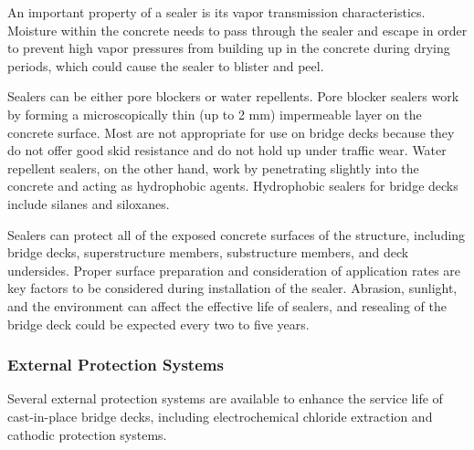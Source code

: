 An important property of a sealer is its vapor transmission characteristics. Moisture within the concrete needs to
pass through the sealer and escape in order to prevent high vapor pressures from building up in the concrete during
drying periods, which could cause the sealer to blister and peel.

Sealers can be either pore blockers or water repellents. Pore blocker sealers work by forming a microscopically
thin (up to 2 mm) impermeable layer on the concrete surface. Most are not appropriate for use on bridge decks
because they do not offer good skid resistance and do not hold up under traffic wear. Water repellent sealers, on the
other hand, work by penetrating slightly into the concrete and acting as hydrophobic agents. Hydrophobic sealers for
bridge decks include silanes and siloxanes.

Sealers can protect all of the exposed concrete surfaces of the structure, including bridge decks, superstructure
members, substructure members, and deck undersides. Proper surface preparation and consideration of application
rates are key factors to be considered during installation of the sealer. Abrasion, sunlight, and the environment can
affect the effective life of sealers, and resealing of the bridge deck could be expected every two to five years.


\subsubsection{External Protection Systems}
Several external protection systems are available to enhance the service life of cast-in-place bridge decks,
including electrochemical chloride extraction and cathodic protection systems.

